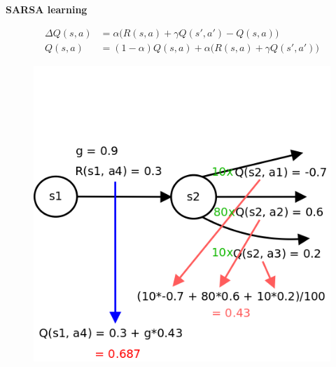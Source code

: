 \documentclass[xcolor=dvipsnames]{beamer}
\begin{document}
\begin{frame}{\bf SARSA learning}

\begin{align*}
\Delta Q(s, a) &= \alpha\Big(R(s, a) + \gamma Q(s', a') - Q(s, a)\Big) \\
Q(s, a) &= (1-\alpha)Q(s, a) + \alpha\Big(R(s, a) + \gamma Q(s', a')\Big)
\end{align*}

\begin{figure}
  \includegraphics[scale=0.23]{../../diagrams/sarsa_learning_detail.png}
\end{figure}

\end{frame}
\end{document}
